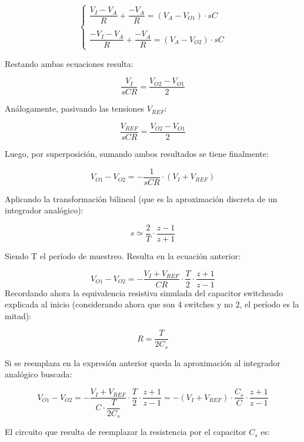 \documentclass[assd_tp3_main.tex]{subfiles}
\begin{document}
\[
\left\lbrace
\begin{array}{l}
\dfrac{V_I-V_A}{R} + \dfrac{-V_A}{R} = (V_A-V_{O1}) \cdot sC \\
\\
\dfrac{-V_I-V_A}{R} + \dfrac{-V_A}{R} = (V_A-V_{O2}) \cdot sC
\end{array}
\right.
\] 

Restando ambas ecuaciones resulta:

\[
\frac{V_I}{sCR} = \frac{V_{O2}-V_{O1}}{2}
\]

Análogamente, pasivando las tensiones $V_{REF}$:

\[
\frac{V_{REF}}{sCR} = \frac{V_{O2}-V_{O1}}{2}
\]

Luego, por superposición, sumando ambos resultados se tiene finalmente:

\[
V_{O1} - V_{O2} = -\frac{1}{sCR} \cdot (V_I + V_{REF})
\]

Aplicando la transformación bilineal (que es la aproximación discreta de un integrador analógico):

\[
s \simeq \frac{2}{T} \cdot \frac{z-1}{z+1}
\]

Siendo T el período de muestreo. Resulta en la ecuación anterior:

\[
V_{O1}-V_{O2} = -\frac{V_I+V_{REF}}{CR} \cdot \frac{T}{2} \cdot \frac{z+1}{z-1}
\]
\newpage
Recordando ahora la equivalencia resistiva simulada del capacitor switcheado explicada al inicio (considerando ahora que son 4 switches y no 2, el período es la mitad):

\[
R = \frac{T}{2C_s}
\]

Si se reemplaza en la expresión anterior queda la aproximación al integrador analógico buscada:

\[
V_{O1}-V_{O2} = -\frac{V_I+V_{REF}}{C \cdot \dfrac{T}{2C_s}} \cdot \frac{T}{2} \cdot \frac{z+1}{z-1} = -(V_I + V_{REF}) \cdot \frac{C_s}{C} \cdot \frac{z+1}{z-1}
\]

El circuito que resulta de reemplazar la resistencia por el capacitor $C_s$ es:
\end{document}
